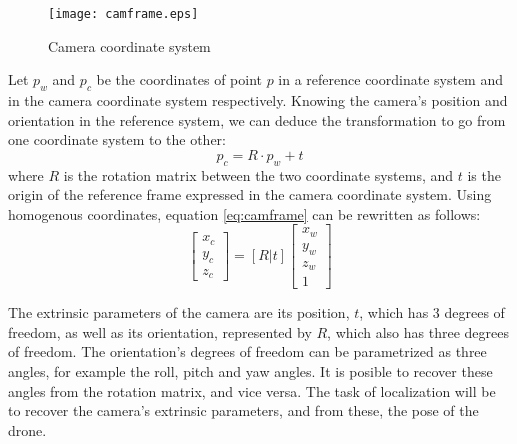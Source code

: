 \begin{figure}[H]
  \centering
  \texttt{[image: camframe.eps]}
  \caption{Camera coordinate system}
  \label{fig:camframe}
\end{figure}

Let $p_w$ and $p_c$ be the coordinates of point $p$ in a reference coordinate system and in the camera coordinate system respectively. Knowing the camera's position and orientation in the reference system, we can deduce the transformation to go from one coordinate system to the other:
\begin{equation}\label{eq:camframe}
  p_c = R \cdot p_w + t
\end{equation}
where $R$ is the rotation matrix between the two coordinate systems, and $t$ is the origin of the reference frame expressed in the camera coordinate system. Using homogenous coordinates, equation \ref{eq:camframe} can be rewritten as follows:
\begin{equation}\label{eq:camframe_bis}
  \begin{bmatrix}
     x_c \\
     y_c \\
     z_c
   \end{bmatrix}
     = [R|t]
   \begin{bmatrix}
      x_w \\
      y_w \\
      z_w \\
      1
   \end{bmatrix}
\end{equation}

The extrinsic parameters of the camera are its position, $t$, which has 3 degrees of freedom, as well as its orientation, represented by $R$, which also has three degrees of freedom. The orientation's degrees of freedom can be parametrized as three angles, for example the roll, pitch and yaw angles. It is posible to recover these angles from the rotation matrix, and vice versa. The task of localization will be to recover the camera's extrinsic parameters, and from these, the pose of the drone.

